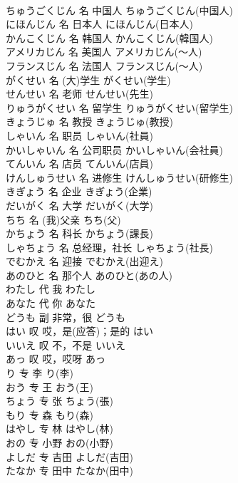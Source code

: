 \documentclass[8pt]{extreport}
\begin{document}
\begin{CJK}{UTF8}{min}
\\	ちゅうごくじん	名	中国人	ちゅうごくじん(中国人)	
\\	にほんじん	名	日本人	にほんじん(日本人)	
\\	かんこくじん	名	韩国人	かんこくじん(韓国人)	
\\	アメリカじん	名	美国人	アメリカじん(～人)	
\\	フランスじん	名	法国人	フランスじん(～人)	
\\	がくせい	名	(大)学生	がくせい(学生)	
\\	せんせい	名	老师	せんせい(先生)	
\\	りゅうがくせい	名	留学生	りゅうがくせい(留学生)	
\\	きょうじゅ	名	教授	きょうじゅ(教授)	
\\	しゃいん	名	职员	しゃいん(社員)	
\\	かいしゃいん	名	公司职员	かいしゃいん(会社員)	
\\	てんいん	名	店员	てんいん(店員)	
\\	けんしゅうせい	名	进修生	けんしゅうせい(研修生)	
\\	きぎょう	名	企业	きぎょう(企業)	
\\	だいがく	名	大学	だいがく(大学)	
\\	ちち	名	(我)父亲	ちち(父)	
\\	かちょう	名	科长	かちょう(課長)	
\\	しゃちょう	名	总经理，社长	しゃちょう(社長)	
\\	でむかえ	名	迎接	でむかえ(出迎え)	
\\	あのひと	名	那个人	あのひと(あの人)	
\\	わたし	代	我	わたし	
\\	あなた	代	你	あなた	
\\	どうも	副	非常，很	どうも	
\\	はい	叹	哎，是(应答)；是的	はい	
\\	いいえ	叹	不，不是	いいえ	
\\	あっ	叹	哎，哎呀	あっ	
\\	り	专	李	り(李)	
\\	おう	专	王	おう(王)	
\\	ちょう	专	张	ちょう(張)	
\\	もり	专	森	もり(森)	
\\	はやし	专	林	はやし(林)	
\\	おの	专	小野	おの(小野)	
\\	よしだ	专	吉田	よしだ(吉田)	
\\	たなか	专	田中	たなか(田中)	

\end{CJK}
\end{document}
